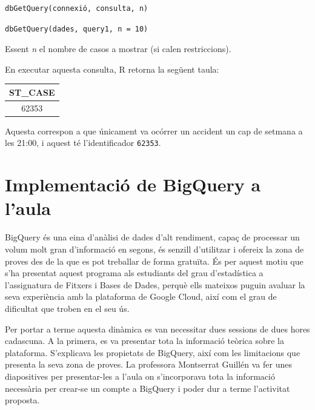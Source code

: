 \documentclass[12pt,longbibliography]{article}
\theoremstyle{definition}
\theoremstyle{remark}
\begin{document}
\begin{multicols}{2}

\begin{verbatim}
dbGetQuery(connexió, consulta, n)
\end{verbatim}

\columnbreak

\begin{verbatim}
dbGetQuery(dades, query1, n = 10)
\end{verbatim}

\end{multicols}

Essent \emph{n} el nombre de casos a mostrar (si calen restriccions).


En executar aquesta consulta, R retorna la següent taula:

\begin{table}[h]
\centering
\begin{tabular}{|c|}
\hline
\textbf{ST\_CASE} \\ \hline
62353             \\ \hline
\end{tabular}
\end{table}

Aquesta correspon a que únicament va ocórrer un accident un cap de setmana a les 21:00, i aquest té l'identificador \texttt{62353}.

\newpage

\section{Implementació de BigQuery a l'aula}

BigQuery és una eina d'anàlisi de dades d'alt rendiment, capaç de processar un volum molt gran d'informació en segons, és senzill d'utilitzar i ofereix la zona de proves des de la que es pot treballar de forma gratuïta. És per aquest motiu que s'ha presentat aquest programa als estudiants del grau d'estadística a l'assignatura de Fitxers i Bases de Dades, perquè ells mateixos puguin avaluar la seva experiència amb la plataforma de Google Cloud, així com el grau de dificultat que troben en el seu ús.

Per portar a terme aquesta dinàmica es van necessitar dues sessions de dues hores cadascuna. A la primera, es va presentar tota la informació teòrica sobre la plataforma. S'explicava les propietats de BigQuery, així com les limitacions que presenta la seva zona de proves. La professora Montserrat Guillén va fer unes diapositives per presentar-les a l'aula on s'incorporava tota la informació necessària per crear-se un compte a BigQuery i poder dur a terme l'activitat proposta.
\end{document}
